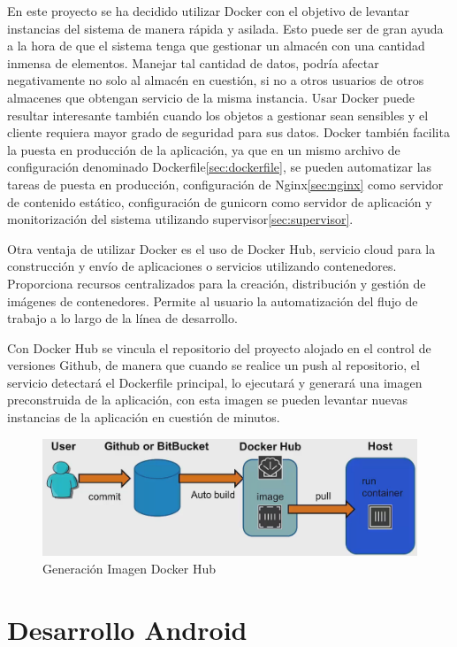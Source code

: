 \documentclass[a4paper,11pt]{book}
\begin{document}
En este proyecto se ha decidido utilizar Docker con el objetivo de levantar instancias del sistema de manera rápida y asilada. Esto puede ser de gran ayuda a la hora de que el sistema tenga que gestionar un almacén con una cantidad inmensa de elementos. Manejar tal cantidad de datos, podría afectar negativamente no solo al almacén en cuestión, si no a otros usuarios de otros almacenes que obtengan servicio de la misma instancia. Usar Docker puede resultar interesante también cuando los objetos a gestionar sean sensibles y el cliente requiera mayor grado de seguridad para sus datos. Docker también facilita la puesta en producción de la aplicación, ya que en un mismo archivo de configuración denominado Dockerfile\ref{sec:dockerfile}, se pueden automatizar las tareas de puesta en producción, configuración de Nginx\ref{sec:nginx} como servidor de contenido estático, configuración de gunicorn como servidor de aplicación y monitorización del sistema utilizando supervisor\ref{sec:supervisor}. 

Otra ventaja de utilizar Docker es el uso de Docker Hub\cite{dkh}, servicio cloud para la construcción y envío de aplicaciones o servicios utilizando contenedores. Proporciona recursos centralizados para la creación, distribución y gestión de imágenes de contenedores. Permite al usuario la automatización del flujo de trabajo a lo largo de la línea de desarrollo.

Con Docker Hub se vincula el repositorio del proyecto alojado en el control de versiones Github, de manera que cuando se realice un push al repositorio, el servicio detectará el Dockerfile principal, lo ejecutará y generará una imagen preconstruida de la aplicación, con esta imagen se pueden levantar nuevas instancias de la aplicación en cuestión de minutos. 


\begin{figure}[H] 
\centering 
\includegraphics[scale=0.35]{imagenes/desarrollo_herramienta/dockerhub.png}
\caption{ Generación Imagen Docker Hub\cite{dkh2}}
\end{figure}


\section{Desarrollo Android}
\end{document}

